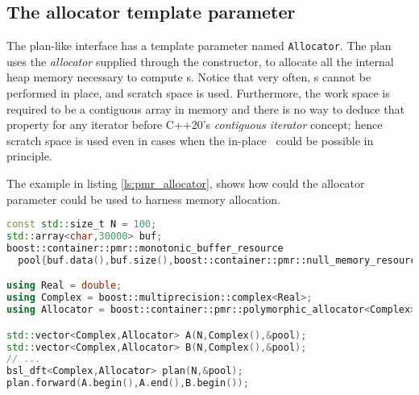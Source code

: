 \subsection{The allocator template parameter}
The plan-like interface has a template parameter named \verb|Allocator|.
The plan uses the \emph{allocator} supplied through the constructor, to allocate
all the internal heap memory necessary to compute \dft s.
Notice that very often, \dft s cannot be performed in place, and scratch space
is used. Furthermore, the work space is required to be a contiguous array in
memory and there is no way to deduce that property for any iterator before
C++20's \emph{contiguous iterator} concept; hence scratch space is used even in
cases when the in-place \dft\ could be possible in principle.

The example in listing \ref{ls:pmr_allocator}, shows how could the allocator
parameter could be used to harness memory allocation.

\begin{lstlisting}[language=C++,caption=Example use of custom allocators.,label=ls:pmr_allocator]
const std::size_t N = 100;
std::array<char,30000> buf;
boost::container::pmr::monotonic_buffer_resource
  pool{buf.data(),buf.size(),boost::container::pmr::null_memory_resource()};

using Real = double;
using Complex = boost::multiprecision::complex<Real>;
using Allocator = boost::container::pmr::polymorphic_allocator<Complex>;

std::vector<Complex,Allocator> A(N,Complex(),&pool);
std::vector<Complex,Allocator> B(N,Complex(),&pool);
// ...
bsl_dft<Complex,Allocator> plan(N,&pool);
plan.forward(A.begin(),A.end(),B.begin());
\end{lstlisting}
